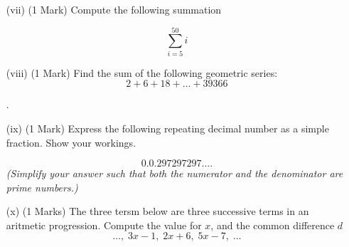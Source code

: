 \documentclass[11pt]{article} %
\begin{document}
\begin{enumerate} %
	\item[(vii)](1 Mark) Compute the following summation
	
	\[ \sum_{i=5}^{50} i \]

	\vspace{5.5cm}
	\item[(viii)] (1 Mark) Find the sum of the following geometric series: 
		\[2 + 6 + 18 +  \ldots + 39366		\]



\newpage
.
\newpage	
	\item[(ix)] (1 Mark) Express the following repeating decimal number as a simple fraction. Show your workings.
	
	\[0.0.297297297....\]
\textit{(Simplify your answer such that both the numerator and the denominator are prime numbers.)}
	\vspace{5.5cm}

	\item[(x)] (1 Marks) The three tersm below are three successive terms in an aritmetic progression. Compute the value for $x$, and the common difference $d$
		\[ \ldots,\; 3x-1,\; 2x+6,\;	5x-7,\; \ldots		  \]
		
\end{enumerate}
\end{document}
